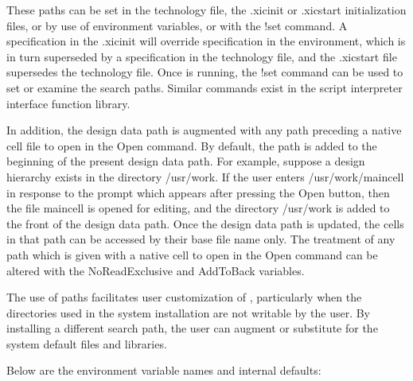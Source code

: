 \begin{itemize}
These paths can be set in the technology file, the {\vt .xicinit} or
{\vt .xicstart} initialization files, or by use of environment
variables, or with the {\cb !set} command.  A specification in the
{\vt .xicinit} will override specification in the environment, which
is in turn superseded by a specification in the technology file, and
the {\vt .xicstart} file supersedes the technology file.  Once {\Xic}
is running, the {\cb !set} command can be used to set or examine the
search paths.  Similar commands exist in the script interpreter
interface function library.

In addition, the design data path is augmented with any path preceding
a native cell file to open in the {\cb Open} command.  By default, the
path is added to the beginning of the present design data path.  For
example, suppose a design hierarchy exists in the directory {\vt
/usr/work}.  If the user enters {\vt /usr/work/maincell} in response
to the prompt which appears after pressing the {\cb Open} button, then
the file {\et maincell} is opened for editing, and the directory {\vt
/usr/work} is added to the front of the design data path.  Once the
design data path is updated, the cells in that path can be accessed by
their base file name only.  The treatment of any path which is given
with a native cell to open in the {\cb Open} command can be altered
with the {\et NoReadExclusive} and {\et AddToBack} variables.

The use of paths facilitates user customization of {\Xic}, particularly
when the directories used in the system installation are not writable
by the user.  By installing a different search path, the user can
augment or substitute for the system default files and libraries.

Below are the environment variable names and internal defaults:


\end{itemize}
